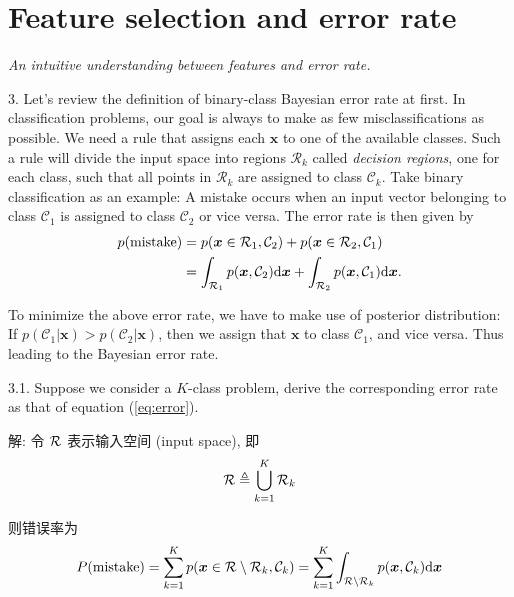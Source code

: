 \documentclass{article}
\begin{document}
\section*{Feature selection and error rate}

\emph{An intuitive understanding between features and error rate.}

3. Let's review the definition of binary-class Bayesian error rate at first. In classification problems, our goal is always to make as few misclassifications as possible. We need a rule that assigns each $\bm{x}$ to one of the available classes. Such a rule will divide the input space into regions $\mathcal{R}_{k}$ called \emph{decision regions}, one for each class, such that all points in $\mathcal{R}_{k}$ are assigned to class $\mathcal{C}_{k}$. Take binary classification as an example: A mistake occurs when an input vector belonging to class $\mathcal{C}_{1}$ is assigned to class $\mathcal{C}_{2}$ or vice versa. The error rate is then given by
\begin{equation}
  \begin{aligned}
    p(\text{mistake})
    &=p(\bm{x}\in \mathcal{R}_{1}, \mathcal{C}_{2})+p(\bm{x}\in \mathcal{R}_{2}, \mathcal{C}_{1})\\
    &=\int_{\mathcal{R}_{1}}p(\bm{x},\mathcal{C}_{2})\mathrm{d}\bm{x}+\int_{\mathcal{R}_{2}}p(\bm{x},\mathcal{C}_{1})\mathrm{d}\bm{x}.\\
  \end{aligned}
  \label{eq:error}
\end{equation}

To minimize the above error rate, we have to make use of posterior distribution: If $p(\mathcal{C}_{1}|\bm{x})>p(\mathcal{C}_{2}|\bm{x})$, then we assign that $\bm{x}$ to class $\mathcal{C}_{1}$, and vice versa. Thus leading to the Bayesian error rate.

3.1. Suppose we consider a $K$-class problem, derive the corresponding error rate as that of equation (\ref{eq:error}).

解: 令 $\mathcal{R}$ 表示输入空间 (input space), 即
\begin{equation}
  \mathcal{R}\triangleq\bigcup_{k=1}^K\mathcal{R}_k
\end{equation}

则错误率为
\begin{equation}
  P(\text{mistake})=\sum_{k=1}^Kp(\bm{x}\in\mathcal{R}\setminus\mathcal{R}_k,\mathcal{C}_k)=\sum_{k=1}^K\int_{\mathcal{R}\setminus\mathcal{R}_k}p(\bm{x},\mathcal{C}_k)\mathrm{d}\bm{x}
\end{equation}
\end{document}
